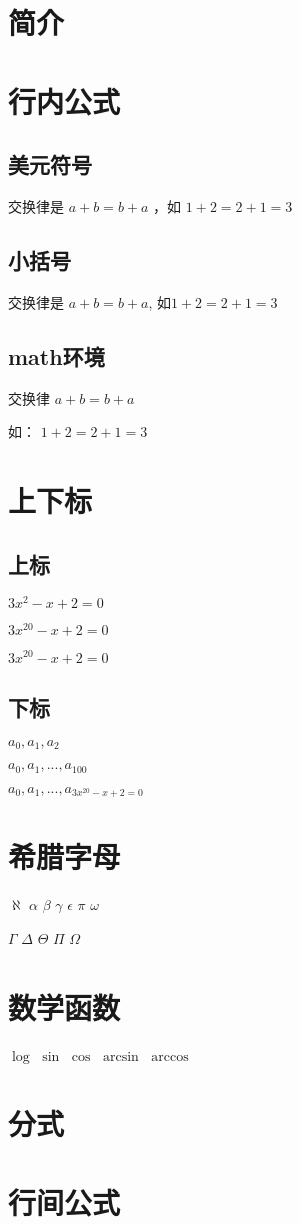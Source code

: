 \documentclass{ctexart}
\begin{document}
	
	\section{简介}
	\section{行内公式}
	\subsection{美元符号}
	交换律是 $a+b = b+a$ ，如 $1+2=2+1=3$
	\subsection{小括号}
	交换律是 \(a+b=b+a\), 如\(1+2=2+1=3\)
	\subsection{math环境}
	交换律 \begin{math}
		a+b=b+a
	\end{math}
	
	如：
	\begin{math}
		1+2=2+1=3
	\end{math}
	
	\section{上下标}
	\subsection{上标}
	$3x^2 -x +2 = 0$  %
	
	$3x^20-x+2=0$
	
	$3x^{20}-x+2=0$
	\subsection{下标}
	$a_0, a_1, a_2$
	
	$a_0, a_1,..., a_{100}$
	
	$a_0, a_1,..., a_{3x^{20}-x+2=0}$
	\section{希腊字母}
	$\aleph$
	$\alpha$
	$\beta$
	$\gamma$
	$\epsilon$
	$\pi$
	$\omega$
	
	$\Gamma$
	$\Delta$
	$\Theta$
	$\Pi$
	$\Omega$
	\section{数学函数}
	$\log$
	$\sin$
	$\cos$
	$\arcsin$
	$\arccos$
	\section{分式}
	
	\section{行间公式}
	
	
\end{document}
